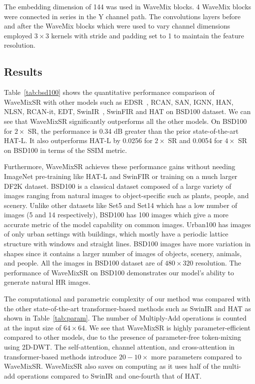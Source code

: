\documentclass{article}
\begin{document}
The embedding dimension of 144 was used in WaveMix blocks. 4 WaveMix blocks were connected in series in the Y channel path. The convolutions layers before and after the WaveMix blocks which were used to vary channel dimensions employed $3\times3$ kernels with stride and padding set to 1 to maintain the feature resolution. 







\subsection{Results}

Table~\ref{tab:bsd100} shows the quantitative performance comparison of WaveMixSR with other models such as EDSR~\cite{lim2017enhanced}, RCAN, SAN, IGNN, HAN, NLSN, RCAN-it, EDT, SwinIR~\cite{liang2021swinir}, SwinFIR and HAT on BSD100 dataset. We can see that WaveMixSR significantly outperforms all the other models. On BSD100 for $2\times$ SR, the performance is 0.34 dB greater than the prior state-of-the-art HAT-L. It also outperforms HAT-L by 0.0256 for $2\times$ SR and 0.0054 for $4\times$ SR on BSD100 in terms of the SSIM metric.


Furthermore, WaveMixSR achieves these performance gains without needing ImageNet pre-training like HAT-L and SwinFIR or training on a much larger DF2K dataset. BSD100 is a classical dataset composed of a large variety of images ranging from natural images to object-specific such as plants, people, and scenery. Unlike other datasets like Set5 and Set14 which has a low number of images (5 and 14 respectively), BSD100 has 100 images which give a more accurate metric of the model capability on common images. Urban100 has images of only urban settings with buildings, which mostly have a periodic lattice structure with windows and straight lines. BSD100 images have more variation in shapes since it contains a larger number of images of objects, scenery, animals, and people. All the images in BSD100 dataset are of $480\times320$ resolution. The performance of WaveMixSR on BSD100 demonstrates our model's ability to generate natural HR images. 

The computational and parametric complexity of our method was compared with the other state-of-the-art transformer-based methods such as SwinIR and HAT as shown in Table~\ref{tab:param}. The number of Multiply-Add operations is counted at the input size of $64\times64$. We see that WaveMixSR is highly parameter-efficient compared to other models, due to the presence of parameter-free token-mixing using 2D-DWT. The self-attention, channel attention, and cross-attention in transformer-based methods introduce $20-10\times$ more parameters compared to WaveMixSR. WaveMixSR also saves on computing as it uses half of the multi-add operations compared to SwinIR and one-fourth that of HAT.
\end{document}
